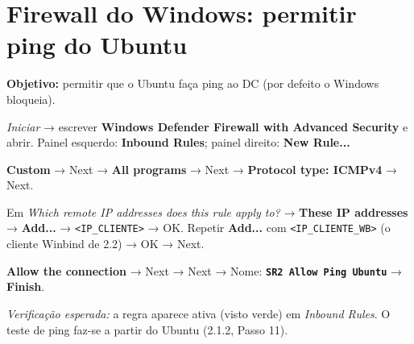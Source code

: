 
\section[Firewall do Windows: permitir ping do Ubuntu]{Firewall do Windows: permitir ping do Ubuntu}


\textbf{Objetivo:} permitir que o Ubuntu faça ping ao DC (por defeito o Windows bloqueia).


\emph{Iniciar} → escrever \textbf{Windows Defender Firewall with Advanced Security} e abrir. Painel esquerdo: \textbf{Inbound Rules}; painel direito: \textbf{New Rule...}


\textbf{Custom} → Next → \textbf{All programs} → Next → \textbf{Protocol type: ICMPv4} → Next.


Em \emph{Which remote IP addresses does this rule apply to?} → \textbf{These IP addresses} → \textbf{Add...} → \texttt{\textless{}IP\_CLIENTE\textgreater{}} → OK. Repetir \textbf{Add...} com \texttt{\textless{}IP\_CLIENTE\_WB\textgreater{}} (o cliente Winbind de 2.2) → OK → Next.


\textbf{Allow the connection} → Next → Next → Nome: \textbf{\texttt{SR2 Allow Ping Ubuntu}} → \textbf{Finish}.

\emph{Verificação esperada:} a regra aparece ativa (visto verde) em \emph{Inbound Rules}. O teste de ping faz-se a partir do Ubuntu (2.1.2, Passo 11).

